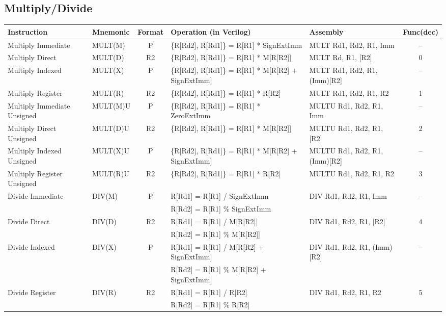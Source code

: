 \documentclass[a4paper,10pt]{article}
\begin{document}
\subsection*{Multiply/Divide}
\begin{tabular}{>{\raggedright\arraybackslash\hangindent=0.5cm\hangafter=1}p{2.5cm}lc>{\raggedright\arraybackslash\hangindent=2cm\hangafter=1}p{5.5cm}>{\raggedright\arraybackslash\hangindent=1.5cm\hangafter=1}p{3.6cm}c}
\toprule
Instruction & Mnemonic & Format & Operation (in Verilog) & Assembly & Func(dec) \\
\midrule
Multiply Immediate & MULT(M) & P & \{R[Rd2], R[Rd1]\} = R[R1] * SignExtImm & MULT Rd1, Rd2, R1, Imm & --\\
Multiply Direct & MULT(D) & R2 & \{R[Rd2], R[Rd1]\} = R[R1] * M[R[R2]] & MULT Rd, R1, [R2] & 0\\
Multiply Indexed & MULT(X) & P & \{R[Rd2], R[Rd1]\} = R[R1] * M[R[R2] + SignExtImm] & MULT Rd1, Rd2, R1, (Imm)[R2] & --\\
Multiply Register & MULT(R) & R2 & \{R[Rd2], R[Rd1]\} = R[R1] * R[R2] & MULT Rd1, Rd2, R1, R2 & 1\\
Multiply Immediate Unsigned & MULT(M)U & P & \{R[Rd2], R[Rd1]\} = R[R1] * ZeroExtImm & MULTU Rd1, Rd2, R1, Imm & --\\
Multiply Direct Unsigned & MULT(D)U & R2 & \{R[Rd2], R[Rd1]\} = R[R1] * M[R[R2]] & MULTU Rd1, Rd2, R1, [R2] & 2\\
Multiply Indexed Unsigned & MULT(X)U & P & \{R[Rd2], R[Rd1]\} = R[R1] * M[R[R2] + SignExtImm] & MULTU Rd1, Rd2, R1, (Imm)[R2] & --\\
Multiply Register Unsigned & MULT(R)U & R2 & \{R[Rd2], R[Rd1]\} = R[R1] * R[R2] & MULTU Rd1, Rd2, R1, R2 & 3\\
Divide Immediate & DIV(M) & P & R[Rd1] = R[R1] / SignExtImm & DIV Rd1, Rd2, R1, Imm & --\\
&&&R[Rd2] = R[R1] \% SignExtImm\\
Divide Direct & DIV(D) & R2 & R[Rd1] = R[R1] / M[R[R2]] & DIV Rd1, Rd2, R1, [R2] & 4\\
&&&R[Rd2] = R[R1] \% M[R[R2]]\\
Divide Indexed & DIV(X) & P & R[Rd1] = R[R1] / M[R[R2] + SignExtImm] & DIV Rd1, Rd2, R1, (Imm)[R2] & --\\
&&&R[Rd2] = R[R1] \% M[R[R2] + SignExtImm]\\
Divide Register & DIV(R) & R2 & R[Rd1] = R[R1] / R[R2] & DIV Rd1, Rd2, R1, R2 & 5\\
&&&R[Rd2] = R[R1] \% R[R2]\\

\end{tabular}
\end{document}
